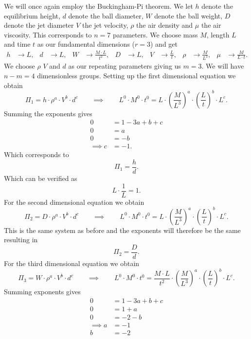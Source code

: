 \begin{derivation}
  We will once again employ the Buckingham-Pi theorem.
  We let $h$ denote the equilibrium height, $d$ denote the ball diameter, $W$ denote the ball weight, $D$ denote the jet diameter $V$ the jet velocity, $\rho$ the air density and $\mu$ the air viscosity.
  This corresponds to $n = 7$ parameters.
  We choose mass $M$, length $L$ and time $t$ as our fundamental dimensions ($r = 3$) and get
  \begin{align*}
    h &\to L, & d &\to L, & W &\to \frac{M \cdot L}{t^2}, & D &\to L, & V &\to \frac{L}{t}, & \rho &\to \frac{M}{L^3}, & \mu &\to \frac{M}{L \cdot t} 
  .\end{align*}
  We choose $\rho$ $V$ and $d$ as our repeating parameters giving us $m = 3$. 
  We will have $n - m = 4$ dimensionless groups.
  Setting up the first dimensional equation we obtain
  \[ 
  \Pi_1 = h \cdot \rho^{a} \cdot V^{b} \cdot d ^{c} \qquad \implies \qquad L^{0} \cdot M^{0} \cdot t ^{0} = L \cdot \left( \frac{M}{L^3} \right)^{a} \cdot \left( \frac{L}{t} \right)^{b} \cdot L^{c}
  .\]
  Summing the exponents gives
  \begin{align*}
    0 &= 1 - 3a + b + c \\
    0 &= a \\
    0 &= -b \\
    \implies c &= -1
  .\end{align*}
  Which corresponds to
  \[ 
  \Pi_1 = \frac{h}{d}
  .\]
  Which can be verified as
  \[ 
  L \cdot \frac{1}{L} = 1
  .\]
  For the second dimensional equation we obtain
  \[ 
  \Pi_2 = D \cdot \rho^a \cdot V^{b} \cdot d ^{c} \qquad \implies \qquad L^{0} \cdot M^{0} \cdot t ^{0} = L \cdot \left( \frac{M}{L^3} \right)^{a} \cdot \left( \frac{L}{t} \right)^{b} \cdot L^{c}
  .\]
  This is the same system as before and the exponents will therefore be the same resulting in
  \[ 
  \Pi_2 = \frac{D}{d}
  .\]
  For the third dimensional equation we obtain
  \[ 
  \Pi_3 = W \cdot \rho^a \cdot V^{b} \cdot d ^{c} \qquad \implies \qquad L^{0} \cdot M^{0} \cdot t ^{0} = \frac{M \cdot L}{t^2} \cdot \left( \frac{M}{L^3} \right)^{a} \cdot \left( \frac{L}{t} \right)^{b} \cdot L^{c}
  .\]
  Summing exponents gives
  \begin{align*}
    0 &= 1 - 3a + b + c \\
    0 &= 1 + a \\
    0 &= -2 - b \\
    \implies a &= -1 \\
    b &= -2 \\

\end{align*}
\end{derivation}

